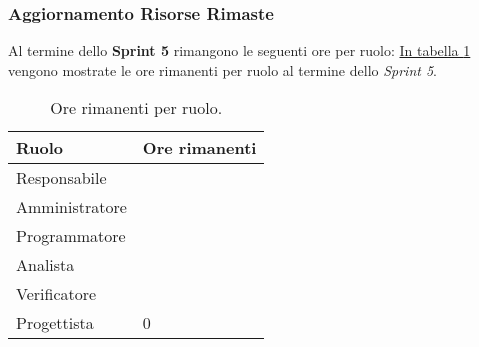 \subsubsection{Aggiornamento Risorse Rimaste}
\label{sec:AggiornamentoRisorse_Sprint5}
Al termine dello \textbf{Sprint 5} rimangono le seguenti ore per ruolo: \hyperref[tab:sprint5_ore_rimanenti]{In tabella \ref{tab:sprint5_ore_rimanenti}} vengono mostrate le ore rimanenti per ruolo al termine dello \textit{Sprint 5}.

\begin{table}[H]
    \centering
    \begin{tabular}{| l | l |}
    \hline
    \textbf{Ruolo} & 
    \textbf{Ore rimanenti}\\
    \hline
        Responsabile & \\
    \hline
        Amministratore & \\
    \hline
        Programmatore & \\
    \hline
        Analista & \\
    \hline
        Verificatore & \\
    \hline
        Progettista & 0\\
    \hline
    \end{tabular}
    \caption{Ore rimanenti per ruolo.}
    \label{tab:sprint5_ore_rimanenti} 
\end{table}